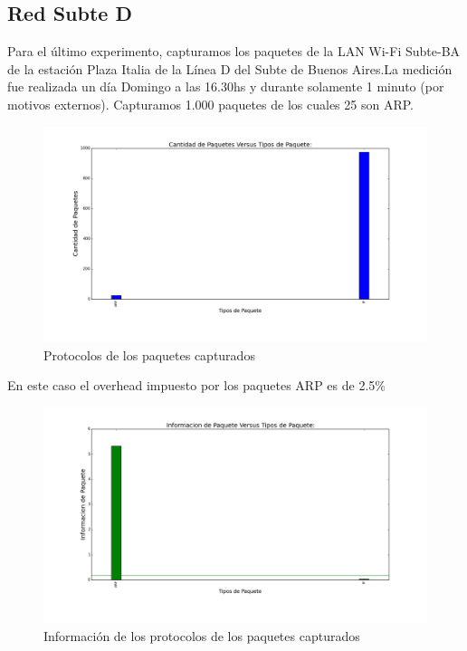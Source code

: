 \subsection{Red Subte D}

Para el último experimento, capturamos los paquetes de la LAN Wi-Fi Subte-BA de la estación Plaza Italia de la Línea D del Subte de Buenos Aires.La medición fue realizada un día Domingo a las 16.30hs y durante solamente 1 minuto (por motivos externos). Capturamos 1.000 paquetes de los cuales 25 son ARP.

\begin{figure}[H]
       \centering
       \includegraphics[width=1\textwidth]{../resultados/subte/histogram_types.png}
       \caption{Protocolos de los paquetes capturados}
       \label{red-Starbucks-types}
\end{figure}

En este caso el overhead impuesto por los paquetes ARP es de 2.5\%

\begin{figure}[H]
       \centering
       \includegraphics[width=1\textwidth]{../resultados/subte/histogram_types_information.png}
       \caption{Información de los protocolos de los paquetes capturados}
       \label{red-Starbucks-types-information}
\end{figure}

